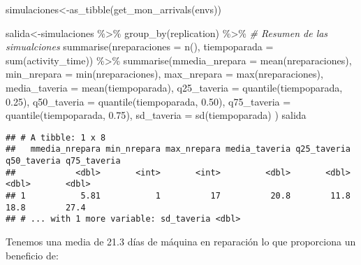 \documentclass[
]{book}
\newenvironment{Shaded}{\begin{snugshade}}{\end{snugshade}}
\newcommand{\AttributeTok}[1]{\textcolor[rgb]{0.77,0.63,0.00}{#1}}
\newcommand{\CommentTok}[1]{\textcolor[rgb]{0.56,0.35,0.01}{\textit{#1}}}
\newcommand{\DecValTok}[1]{\textcolor[rgb]{0.00,0.00,0.81}{#1}}
\newcommand{\FloatTok}[1]{\textcolor[rgb]{0.00,0.00,0.81}{#1}}
\newcommand{\FunctionTok}[1]{\textcolor[rgb]{0.00,0.00,0.00}{#1}}
\newcommand{\NormalTok}[1]{#1}
\newcommand{\OtherTok}[1]{\textcolor[rgb]{0.56,0.35,0.01}{#1}}
\newcommand{\SpecialCharTok}[1]{\textcolor[rgb]{0.00,0.00,0.00}{#1}}
\theoremstyle{definition}
\theoremstyle{definition}
\theoremstyle{definition}
\theoremstyle{definition}
\theoremstyle{remark}
\begin{document}
\begin{Shaded}
\begin{Highlighting}[]
\NormalTok{simulaciones}\OtherTok{\textless{}{-}}\FunctionTok{as\_tibble}\NormalTok{(}\FunctionTok{get\_mon\_arrivals}\NormalTok{(envs))}

\NormalTok{salida}\OtherTok{\textless{}{-}}\NormalTok{simulaciones }\SpecialCharTok{\%\textgreater{}\%} 
  \FunctionTok{group\_by}\NormalTok{(replication) }\SpecialCharTok{\%\textgreater{}\%} 
  \CommentTok{\# Resumen de las simualciones}
  \FunctionTok{summarise}\NormalTok{(}\AttributeTok{nreparaciones =} \FunctionTok{n}\NormalTok{(), }
            \AttributeTok{tiempoparada =} \FunctionTok{sum}\NormalTok{(activity\_time)) }\SpecialCharTok{\%\textgreater{}\%} 
  \FunctionTok{summarise}\NormalTok{(}\AttributeTok{mmedia\_nrepara =} \FunctionTok{mean}\NormalTok{(nreparaciones),}
            \AttributeTok{min\_nrepara =} \FunctionTok{min}\NormalTok{(nreparaciones),}
            \AttributeTok{max\_nrepara =} \FunctionTok{max}\NormalTok{(nreparaciones),}
            \AttributeTok{media\_taveria =} \FunctionTok{mean}\NormalTok{(tiempoparada),}
            \AttributeTok{q25\_taveria =} \FunctionTok{quantile}\NormalTok{(tiempoparada, }\FloatTok{0.25}\NormalTok{),}
            \AttributeTok{q50\_taveria =} \FunctionTok{quantile}\NormalTok{(tiempoparada, }\FloatTok{0.50}\NormalTok{),}
            \AttributeTok{q75\_taveria =} \FunctionTok{quantile}\NormalTok{(tiempoparada, }\FloatTok{0.75}\NormalTok{),}
            \AttributeTok{sd\_taveria =} \FunctionTok{sd}\NormalTok{(tiempoparada) }
\NormalTok{            )}
\NormalTok{salida}
\end{Highlighting}
\end{Shaded}

\begin{verbatim}
## # A tibble: 1 x 8
##   mmedia_nrepara min_nrepara max_nrepara media_taveria q25_taveria q50_taveria q75_taveria
##            <dbl>       <int>       <int>         <dbl>       <dbl>       <dbl>       <dbl>
## 1           5.81           1          17          20.8        11.8        18.8        27.4
## # ... with 1 more variable: sd_taveria <dbl>
\end{verbatim}

Tenemos una media de 21.3 días de máquina en reparación lo que proporciona un beneficio de:

\begin{Shaded}
\end{Shaded}
\end{document}
